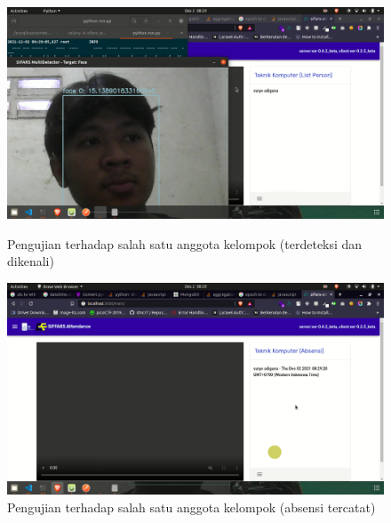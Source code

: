 \begin{figure} [p] \centering
    \includegraphics[scale=0.2]{gambar/demo1.png}
    \caption{Pengujian terhadap salah satu anggota kelompok (terdeteksi dan dikenali)}
    \label{fig:SfDemo1}
  
    \includegraphics[scale=0.2]{gambar/demo2.png}
    \caption{Pengujian terhadap salah satu anggota kelompok (absensi tercatat)}
    \label{fig:SfDemo2}    
  \end{figure}

